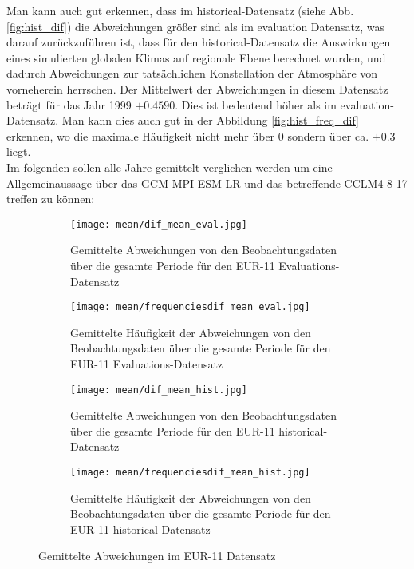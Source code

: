 Man kann auch gut erkennen, dass im historical-Datensatz (siehe Abb. \ref{fig:hist_dif}) die Abweichungen größer sind als im evaluation Datensatz, was darauf zurückzuführen ist, dass für den historical-Datensatz die Auswirkungen eines simulierten globalen Klimas auf regionale Ebene berechnet wurden, und dadurch Abweichungen zur tatsächlichen Konstellation der Atmosphäre von vorneherein herrschen. Der Mittelwert der Abweichungen in diesem Datensatz beträgt für das Jahr 1999 $+0.4590$. Dies ist bedeutend höher als im evaluation-Datensatz. Man kann dies auch gut in der Abbildung \ref{fig:hist_freq_dif} erkennen, wo die maximale Häufigkeit nicht mehr über $0$ sondern über ca. $+0.3$ liegt.\\
Im folgenden sollen alle Jahre gemittelt verglichen werden um eine Allgemeinaussage über das GCM MPI-ESM-LR und das betreffende CCLM4-8-17 treffen zu können:\\
\begin{figure}[hbt!]
	\begin{subfigure}{0.49\textwidth}
	\centering
	\texttt{[image: mean/dif\_mean\_eval.jpg]}
	\caption{Gemittelte Abweichungen von den Beobachtungsdaten über die gesamte Periode für den EUR-11 Evaluations-Datensatz}
	\label{fig:mean_dif_eval}
	\end{subfigure}
	\begin{subfigure}{0.49\textwidth}
		\centering
		\texttt{[image: mean/frequenciesdif\_mean\_eval.jpg]}
		\caption{Gemittelte Häufigkeit der Abweichungen von den Beobachtungsdaten über die gesamte Periode für den EUR-11 Evaluations-Datensatz}
		\label{fig:freq_mean_dif_eval}
	\end{subfigure}
	\begin{subfigure}{0.49\textwidth}
	\centering
	\texttt{[image: mean/dif\_mean\_hist.jpg]}
	\caption{Gemittelte Abweichungen von den Beobachtungsdaten über die gesamte Periode für den EUR-11 historical-Datensatz}
	\label{fig:mean_dif_hist}
	\end{subfigure}
	\begin{subfigure}{0.49\textwidth}
			\centering
		\texttt{[image: mean/frequenciesdif\_mean\_hist.jpg]}
		\caption{Gemittelte Häufigkeit der Abweichungen von den Beobachtungsdaten über die gesamte Periode für den EUR-11  historical-Datensatz}
		\label{fig:freq_mean_dif_hist}
	\end{subfigure}
	\caption{Gemittelte Abweichungen im EUR-11 Datensatz}
\end{figure}
\\
